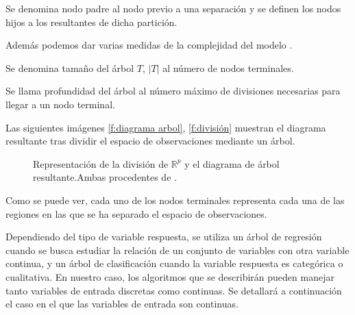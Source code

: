 \begin{defi}
Se denomina nodo padre al nodo previo a una  separación y se definen los nodos hijos a los resultantes de dicha partición. 
\end{defi}
\noindent Además podemos dar varias medidas de la complejidad del modelo \cite{Hastie 2001}.
\begin{defi}
Se denomina  tamaño del árbol $T$, $|T|$ al número de nodos terminales. 
\end{defi}
\begin{defi}
Se llama profundidad del árbol al número máximo de divisiones necesarias para llegar a un nodo terminal. 
\end{defi}
\noindent Las  siguientes imágenes \ref{f:diagrama arbol}, \ref{f:división}  muestran el diagrama resultante tras dividir el espacio de observaciones mediante un árbol. 

\begin{figure}[h]
 \centering
 \caption{Representación de la división de $\mathbb{R}^p$ y el diagrama de árbol resultante.Ambas procedentes de \cite{Hastie 2001}.}
 \label{f:MARC1}
\end{figure}

\noindent Como se puede ver, cada uno de los nodos terminales representa cada una de las regiones en las que se ha separado el espacio de observaciones. 

\noindent Dependiendo del tipo de variable respuesta, se utiliza un árbol de regresión cuando se busca estudiar la relación de un conjunto de variables con otra variable continua, y un árbol de clasificación cuando la variable respuesta es categórica o cualitativa. En nuestro caso, los algoritmos que se describirán pueden manejar tanto variables de entrada discretas como continuas. Se detallará a continuación el caso en el que las variables de entrada son continuas.

